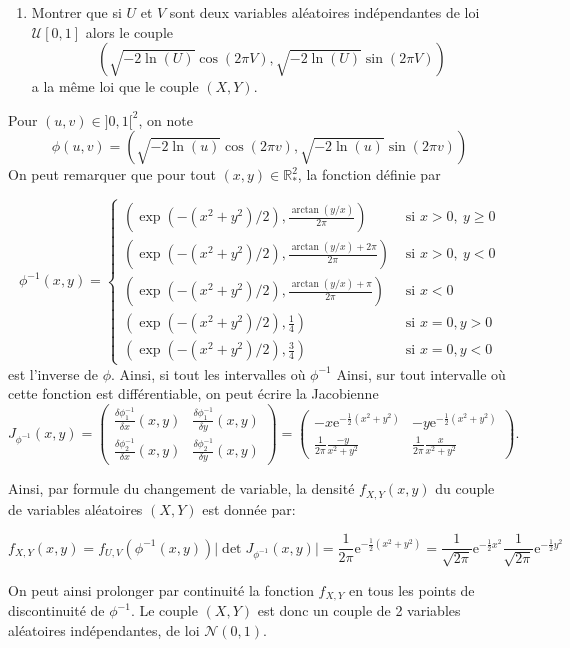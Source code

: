 \documentclass[
]{article}
\providecommand{\tightlist}{%
  \setlength{\itemsep}{0pt}\setlength{\parskip}{0pt}}
\newenvironment{Correction}%
  { \vspace{\baselineskip}\begin{mdframed}[backgroundcolor=my_green]}%
  {\end{mdframed}}
\begin{document}
\begin{enumerate}
\def\labelenumi{\arabic{enumi}.}
\tightlist
\item
  Montrer que si \(U\) et \(V\) sont deux variables aléatoires
  indépendantes de loi \(\mathcal{U}[0, 1]\) alors le couple
  \[\left(\sqrt{- 2 \ln(U)} \cos (2\pi V), \sqrt{- 2 \ln(U)} \sin(2\pi V)\right)\]
  a la même loi que le couple \((X, Y)\).
\end{enumerate}

\begin{Correction}
Pour $(u, v) \in ]0,1[^2$, on note 
$$\phi(u, v) = \left(\sqrt{- 2 \ln(u)} \cos (2\pi v), \sqrt{- 2 \ln(u)} \sin(2\pi v)\right)$$
On peut remarquer que pour tout $(x, y) \in \mathbb{R}^2_*$, la fonction définie par

$$\phi^{-1}(x, y) = 
\left\lbrace
\begin{array}{lr}
\left(\exp(-(x^2 + y^2)/2),  \frac{\arctan(y / x)}{2\pi} \right) & \text{ si } x > 0,~ y \geq 0\\
\left(\exp(-(x^2 + y^2)/2),  \frac{\arctan(y / x) + 2\pi}{2\pi} \right) & \text{ si } x > 0,~ y < 0\\
\left(\exp(-(x^2 + y^2)/2),  \frac{\arctan(y / x) + \pi}{2\pi} \right) & \text{ si } x < 0\\
\left(\exp(-(x^2 + y^2)/2),  \frac{1}{4} \right) & \text{ si } x = 0, y > 0\\
\left(\exp(-(x^2 + y^2)/2),  \frac{3}{4} \right) & \text{ si } x = 0, y < 0
\end{array}
\right.$$
est l'inverse de $\phi$. Ainsi, si tout les intervalles où $\phi^{-1}$
Ainsi, sur tout intervalle où cette fonction est différentiable, on peut écrire la Jacobienne
$$J_{\phi^{-1}}(x, y) = \begin{pmatrix}
\frac{\delta \phi^{-1}_1}{\delta x}(x, y) & \frac{\delta \phi^{-1}_1}{\delta y}(x, y)\\
\frac{\delta \phi^{-1}_2}{\delta x}(x, y) & \frac{\delta \phi^{-1}_2}{\delta y}(x, y)
\end{pmatrix}
=
\begin{pmatrix}
-x \text{e}^{-\frac{1}{2}(x ^2 + y^2)} &
-y \text{e}^{-\frac{1}{2}(x ^2 + y^2)} \\
\frac{1}{2\pi}\frac{-y}{x^2 + y ^2} &
\frac{1}{2\pi}\frac{x}{x^2 + y ^2}
\end{pmatrix}.$$

Ainsi, par formule du changement de variable, la densité $f_{X,Y}(x, y)$ du couple de variables aléatoires $(X, Y)$ est donnée par:

$$f_{X,Y}(x, y) = f_{U,V}(\phi^{-1}(x, y))\vert\det J_{\phi^{-1}}(x, y)\vert = \frac{1}{2\pi}\text{e}^{-\frac{1}{2}(x ^2 + y^2)} =  \frac{1}{\sqrt{2\pi}}\text{e}^{-\frac{1}{2}x^2}\frac{1}{\sqrt{2\pi}}\text{e}^{-\frac{1}{2}y^2}$$

On peut ainsi prolonger par continuité la fonction $f_{X, Y}$ en tous les points de discontinuité de $\phi^{-1}$.
Le couple $(X, Y)$ est donc un couple de 2 variables aléatoires indépendantes, de loi $\mathcal{N}(0, 1)$.
\end{Correction}
\end{document}
